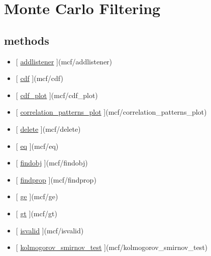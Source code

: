 \documentclass[letterpaper,10pt,english]{sphinxmanual}
\begin{document}
\chapter{Monte Carlo Filtering}
\label{classes/utils/@mcf/mcf:monte-carlo-filtering}\label{classes/utils/@mcf/mcf::doc}

\section{methods}
\label{classes/utils/@mcf/mcf:methods}\begin{itemize}
\item {} 
{[} {\hyperref[classes/utils/@mcf/mcf:addlistener]{addlistener}} {]}(mcf/addlistener)

\item {} 
{[} {\hyperref[classes/utils/@mcf/mcf:cdf]{cdf}} {]}(mcf/cdf)

\item {} 
{[} {\hyperref[classes/utils/@mcf/mcf:cdf-plot]{cdf\_plot}} {]}(mcf/cdf\_plot)

\item {} 
{[} {\hyperref[classes/utils/@mcf/mcf:correlation-patterns-plot]{correlation\_patterns\_plot}} {]}(mcf/correlation\_patterns\_plot)

\item {} 
{[} {\hyperref[classes/utils/@mcf/mcf:delete]{delete}} {]}(mcf/delete)

\item {} 
{[} {\hyperref[classes/utils/@mcf/mcf:eq]{eq}} {]}(mcf/eq)

\item {} 
{[} {\hyperref[classes/utils/@mcf/mcf:findobj]{findobj}} {]}(mcf/findobj)

\item {} 
{[} {\hyperref[classes/utils/@mcf/mcf:findprop]{findprop}} {]}(mcf/findprop)

\item {} 
{[} {\hyperref[classes/utils/@mcf/mcf:ge]{ge}} {]}(mcf/ge)

\item {} 
{[} {\hyperref[classes/utils/@mcf/mcf:gt]{gt}} {]}(mcf/gt)

\item {} 
{[} {\hyperref[classes/utils/@mcf/mcf:isvalid]{isvalid}} {]}(mcf/isvalid)

\item {} 
{[} {\hyperref[classes/utils/@mcf/mcf:kolmogorov-smirnov-test]{kolmogorov\_smirnov\_test}} {]}(mcf/kolmogorov\_smirnov\_test)


\end{itemize}
\end{document}
